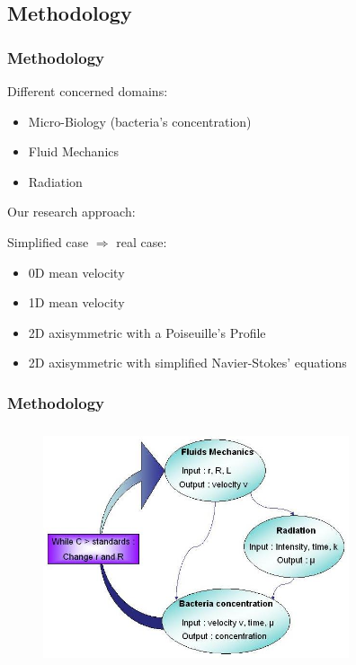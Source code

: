   \subsection{Methodology}

  \begin{frame}
          \frametitle{Methodology}
  \begin{block}{Different concerned domains:}
  \begin{itemize}[<+->]
  \item Micro-Biology (bacteria's concentration)
  \item Fluid Mechanics
  \item Radiation
  \end{itemize}
  \end{block}
  \pause
   {Our research approach: }
  \begin{block}{Simplified case $\Rightarrow$ real case:}
  \begin{itemize}[<+->]
  \item 0D mean velocity
  \item 1D mean velocity
  \item 2D axisymmetric with a Poiseuille's Profile
  \item 2D axisymmetric with simplified Navier-Stokes' equations
  \end{itemize}
  \end{block}
  \end{frame}


  \begin{frame}
          \frametitle{Methodology}
          \begin{figure}
                  \includegraphics[width=9cm,height=7cm]{./images/methodology2.jpg}
          \end{figure}
  \end{frame}

